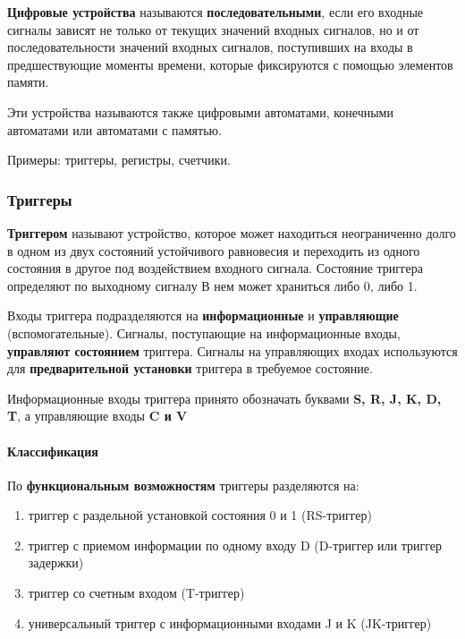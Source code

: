 \documentclass{article}
\begin{document}
\begin{flushleft}

\textbf{Цифровые устройства} называются \textbf{последовательными}, если его входные сигналы зависят не только от текущих значений входных сигналов, но и от последовательности значений входных сигналов, поступивших на входы в предшествующие моменты времени, которые фиксируются с помощью элементов памяти.

\hfill

Эти устройства называются также цифровыми автоматами, конечными автоматами или автоматами с памятью.

\hfill

Примеры: триггеры, регистры, счетчики.

\pagebreak
\subsubsection{Триггеры}

\textbf{Триггером} называют устройство, которое может находиться неограниченно долго в одном из двух состояний устойчивого равновесия и переходить из одного состояния в другое под воздействием входного сигнала. Состояние триггера определяют по выходному сигналу В нем может храниться либо 0, либо 1.

\hfill

Входы триггера подразделяются на \textbf{информационные} и \textbf{управляющие} (вспомогательные). Сигналы, поступающие на информационные входы, \textbf{управляют состоянием} триггера. Сигналы на управляющих входах используются для \textbf{предварительной установки} триггера в требуемое состояние.

\hfill

Информационные входы триггера принято обозначать буквами \textbf{S, R, J, K, D, T}, а управляющие входы \textbf{C и V}

\paragraph{Классификация}

По \textbf{функциональным возможностям} триггеры разделяются на:

\begin{enumerate}
    \item триггер с раздельной установкой состояния 0 и 1 (RS-триггер)
    \item триггер с приемом информации по одному входу D (D-триггер или триггер задержки)
    \item триггер со счетным входом (T-триггер)
    \item универсальный триггер с информационными входами J и K (JK-триггер)
\end{enumerate}


\end{flushleft}
\end{document}
